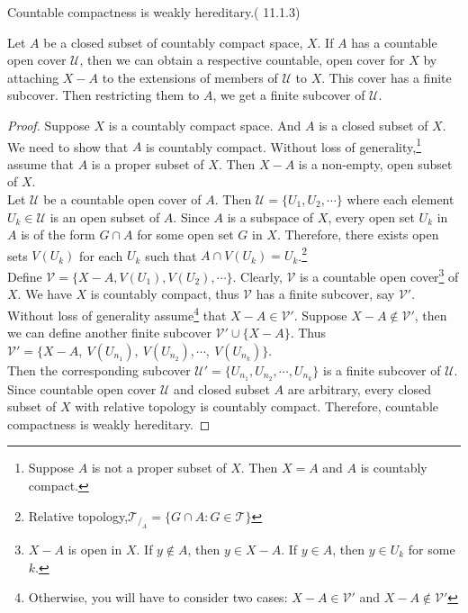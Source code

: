 \begin{theorem}
	Countable compactness is weakly hereditary.(\cite{joshi} 11.1.3)
\end{theorem}
\begin{synopsis}
	Let $A$ be a closed subset of countably compact space, $X$. If $A$ has a countable open cover $\mathcal{U}$, then we can obtain a respective countable, open cover for $X$ by attaching $X-A$ to the extensions of members of $\mathcal{U}$ to $X$. This cover has a finite subcover. Then restricting them to $A$, we get a finite subcover of $\mathcal{U}$.
\end{synopsis}
\begin{proof}
	Suppose $X$ is a countably compact space. And $A$ is a closed subset of $X$. We need to show that $A$ is countably compact. Without loss of generality,\footnote{Suppose $A$ is not a proper subset of $X$. Then $X = A$ and $A$ is countably compact.} assume that $A$ is a proper subset of $X$. Then $X-A$ is a non-empty, open subset of $X$.\\ 

	Let $\mathcal{U}$ be a countable open cover of $A$. Then $\mathcal{U} = \{ U_1, U_2, \cdots \}$ where each element $U_k \in \mathcal{U}$ is an open subset of $A$. Since $A$ is a subspace of $X$, every open set $U_k$ in $A$ is of the form $G \cap A$ for some open set $G$ in $X$. Therefore, there exists open sets $V(U_k)$ for each $U_k$ such that $A \cap V(U_k) = U_k$.\footnote{Relative topology,$\mathcal{T}_{/_A} = \{ G \cap A : G \in \mathcal{T} \}$}\\

	Define $\mathcal{V} = \{ X-A, V(U_1), V(U_2), \cdots \}$. Clearly, $\mathcal{V}$ is a countable open cover\footnote{$X-A$ is open in $X$. If $y \not\in A$, then $y \in X-A$. If $y \in A$, then $y \in U_k$ for some $k$.} of $X$. We have $X$ is countably compact, thus $\mathcal{V}$ has a finite subcover, say $\mathcal{V}'$. Without loss of generality assume\footnote{Otherwise, you will have to consider two cases: $X-A \in \mathcal{V}'$ and $X-A \not\in \mathcal{V}'$} that $X-A \in \mathcal{V}'$. Suppose $X-A \not\in \mathcal{V}'$, then we can define another finite subcover $\mathcal{V}' \cup \{X-A\}$. Thus $\mathcal{V}' = \{ X-A,\ V(U_{n_1}),\ V(U_{n_2}),\cdots,\ V(U_{n_k})\}$.\\

	Then the corresponding subcover $\mathcal{U}'=\{U_{n_1},U_{n_2},\cdots,U_{n_k}\}$ is a finite subcover of $\mathcal{U}$. Since countable open cover $\mathcal{U}$ and closed subset $A$ are arbitrary, every closed subset of $X$ with relative topology is countably compact. Therefore, countable compactness is weakly hereditary.
\end{proof}

